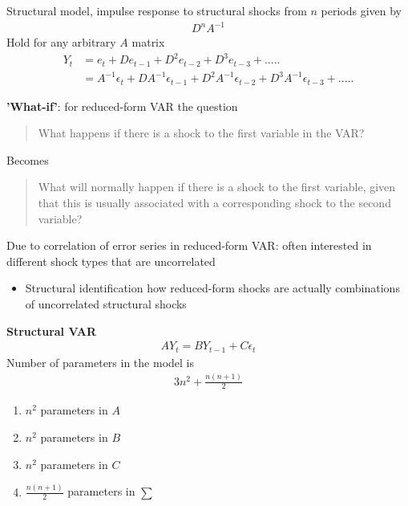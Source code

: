 \documentclass{beamer}
\begin{document}
\begin{frame}
  Structural model, impulse response to structural shocks from $n$ periods given by
  \begin{align}
    D^nA^{-1}
  \end{align}
  \medskip
  Hold for any arbitrary $A$ matrix
  \begin{align}
  Y_t&= e_t + De_{t-1} + D^2e_{t-2} + D^3e_{t-3} + .....\\ \nonumber
     &= A^{-1}\epsilon_t + DA^{-1}\epsilon_{t-1} + D^2A^{-1}\epsilon_{t-2} + D^3A^{-1}\epsilon_{t-3} + ..... \end{align}
\end{frame}

\begin{frame}
  \textbf{'What-if'}: for reduced-form VAR the question  
  \begin{quote}
    What happens if there is a shock to the first variable in the VAR?  
  \end{quote}
  \medskip
  Becomes   
  \begin{quote}
    What will normally happen if there is a shock to the first variable, given that this is usually associated with a corresponding shock to the second variable?    
  \end{quote}
  \medskip
  Due to correlation of error series in reduced-form VAR: often interested in different shock types that are uncorrelated
  \begin{itemize}
    \item Structural identification how reduced-form shocks are actually combinations of uncorrelated structural shocks
  \end{itemize}
\end{frame}

\begin{frame}
  \textbf{Structural VAR}
  \begin{align}  
  AY_t = BY_{t-1} + C\epsilon_t 
  \end{align}
  \medskip
  Number of parameters in the model is
  \begin{align}
    3n^2 + \frac{n(n+1)}{2}
  \end{align}
  \begin{enumerate}
    \item $n^2$ parameters in $A$
    \item $n^2$ parameters in $B$
    \item $n^2$ parameters in $C$
    \medskip
    \item $\frac{n(n+1)}{2}$ parameters in $\sum$
  \end{enumerate}
\end{frame}
\end{document}
